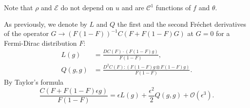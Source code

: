 Note that $\rho$ and $\mathcal E$ do not depend on $u$ and are $\mathcal C^1$ functions of $f$ and $\theta$.







As previously, we denote by $L$ and $Q$ the first and the second Fréchet derivatives of the operator 
$G\to (F(1-F))^{-1}C(F+F(1-F)G)$ at $G=0$ for a Fermi-Dirac distribution $F$:
\begin{equation*}\label{eq:fre}\begin{aligned}
L(g)&=\frac{DC(F)\cdot (F(1-F)g)}{F(1-F)},\\Q(g,g)&=\frac{D^2C(F): 
(F(1-F)g\otimes F(1-F)g)}{F(1-F)}.\end{aligned}
\end{equation*}
By Taylor's formula%
\begin{equation*}\label{eq:expansion-d}
\frac{C(F+F(1-F)\epsilon g)}{F(1-F)}= \epsilon L(g) +\frac{\epsilon^2}{2} Q(g,g)+\mathcal O(\epsilon^3).
\end{equation*}



